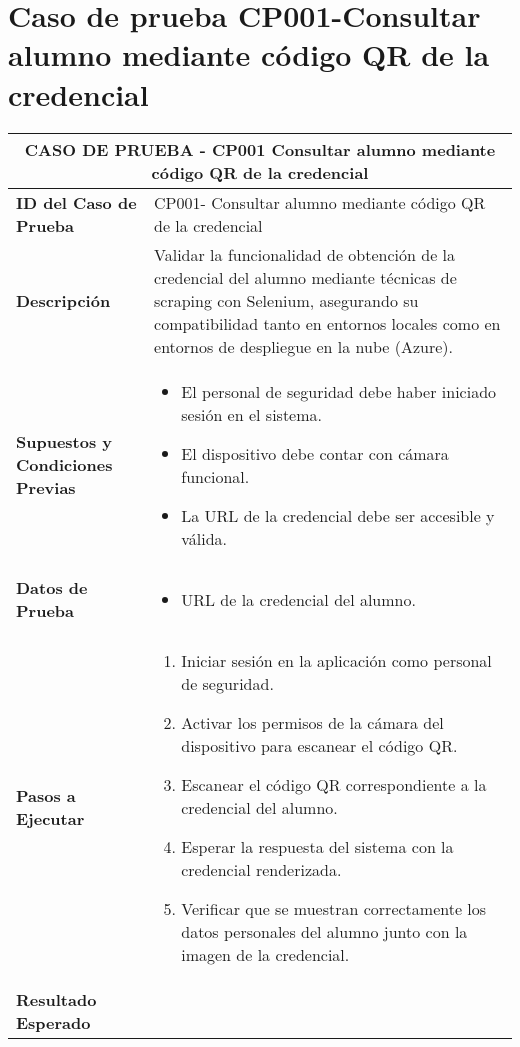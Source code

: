 
\section{Caso de prueba CP001-Consultar alumno mediante código QR de la credencial}

\begin{longtable}{|p{5cm}|p{10cm}|}
	\hline
	\multicolumn{2}{|c|}{\textbf{CASO DE PRUEBA - CP001 Consultar alumno mediante código QR de la credencial}} \\
	\hline
	\textbf{ID del Caso de Prueba} & CP001- Consultar alumno mediante código QR de la credencial \\
	\hline
	\textbf{Descripción} & Validar la funcionalidad de obtención de la credencial del alumno mediante técnicas de scraping con Selenium, asegurando su compatibilidad tanto en entornos locales como en entornos de despliegue en la nube (Azure). \\
	\hline
	\textbf{Supuestos y Condiciones Previas} & 
	\begin{itemize}
		\item El personal de seguridad debe haber iniciado sesión en el sistema.
		\item El dispositivo debe contar con cámara funcional.
		\item La URL de la credencial debe ser accesible y válida.
	\end{itemize} \\
	\hline
	\textbf{Datos de Prueba} & 
	\begin{itemize}
		\item URL de la credencial del alumno.
	\end{itemize} \\
	\hline
	\textbf{Pasos a Ejecutar} & 
	\begin{enumerate}
		\item Iniciar sesión en la aplicación como personal de seguridad.
		\item Activar los permisos de la cámara del dispositivo para escanear el código QR.
		\item Escanear el código QR correspondiente a la credencial del alumno.
		\item Esperar la respuesta del sistema con la credencial renderizada.
		\item Verificar que se muestran correctamente los datos personales del alumno junto con la imagen de la credencial.
	\end{enumerate} \\
	\hline
	\textbf{Resultado Esperado} & 

\end{longtable}
